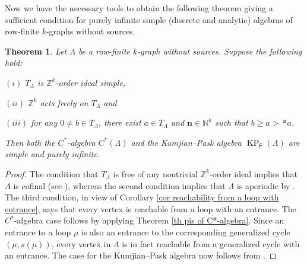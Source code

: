 \documentclass[a4paper,reqno,12pt]{amsart}
\numberwithin{equation}{section}
\newtheorem{thm}{Theorem}[subsection]
\theoremstyle{definition}
\theoremstyle{remark}
\newcommand{\KP}{\operatorname{KP}}
\newcommand{\N}{\mathbf{n}}
\begin{document}
Now we have the necessary tools to obtain the following theorem giving a sufficient condition for purely infinite simple (discrete and analytic) algebras of row-finite $k$-graphs without sources.

\begin{thm}\label{th the TM criterion for purely infinite simplicity}
Let $\Lambda$ be a row-finite $k$-graph without sources. Suppose the following hold:

$(i)$ $T_\Lambda$ is $\mathbb{Z}^k$-order ideal simple,

$(ii)$ $\mathbb{Z}^k$ acts freely on $T_\Lambda$ and 

$(iii)$ for any $0\neq b\in T_\Lambda$, there exist $a\in T_\Lambda$ and $\N\in \mathbb{N}^k$ such that $b\ge a >~^\N a$. 

Then both the $C^*$-algebra $C^*(\Lambda)$ and the Kumjian--Pask algebra $\KP_\mathsf{F}(\Lambda)$ are simple and purely infinite.     
\end{thm}
\begin{proof}
The condition that $T_\Lambda$ is free of any nontrivial $\mathbb{Z}^k$-order ideal implies that $\Lambda$ is cofinal (see \cite[Proposition 4.8]{HMPS1}), whereas the second condition implies that $\Lambda$ is aperiodic by \cite[Proposition 5.2]{HMPS1}. The third condition, in view of Corollary \ref{cor reachability from a loop with entrance}, says that every vertex is reachable from a loop with an entrance. The $C^*$-algebra case follows by applying Theorem \ref{th pis of C*-algebra}. Since an entrance to a loop $\mu$ is also an entrance to the corresponding generalized cycle $(\mu,s(\mu))$, every vertex in $\Lambda$ is in fact reachable from a generalized cycle with an entrance. The case for the Kumjian--Pask algebra now follows from \cite[Theorem 5.4]{LPIS}. 
\end{proof}
\end{document}
